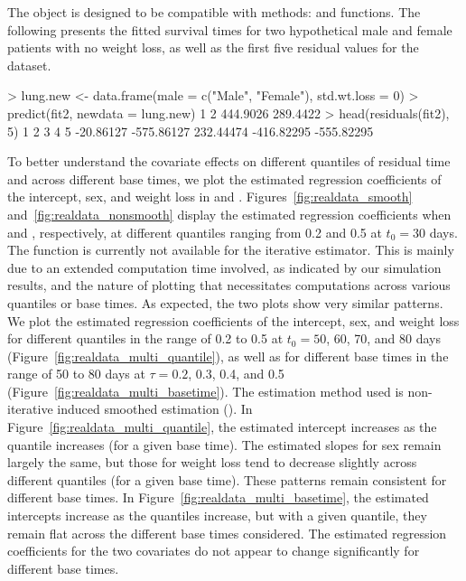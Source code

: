 The  object is designed to be compatible with  methods:  and 
 functions. 
The following presents the fitted survival times for two hypothetical male and female patients with no weight loss, 
as well as the first five residual values for the dataset.
 \begin{example}
  > lung.new <- data.frame(male = c("Male", "Female"), std.wt.loss = 0)
  > predict(fit2, newdata = lung.new)
         1        2 
  444.9026 289.4422 
  > head(residuals(fit2), 5)
         1          2          3          4          5 
 -20.86127 -575.86127  232.44474 -416.82295 -555.82295 
 \end{example}

To better understand the covariate effects on different quantiles of residual time and across different base times, 
we plot the estimated regression coefficients of the intercept, sex, and weight loss in  and .
Figures~\ref{fig:realdata_smooth} and~\ref{fig:realdata_nonsmooth} display the estimated regression coefficients when 
 and , respectively, at
different quantiles ranging from 0.2 and 0.5 at $t_0 = 30$ days. 
The  function is currently not available for the iterative estimator. This is mainly due to an extended computation time involved, as indicated by our simulation results, and the nature of plotting that necessitates computations across various quantiles or base times.
As expected, the two plots show very similar patterns. 
We plot the estimated regression coefficients of the intercept, sex, and weight loss for different quantiles in the range
of 0.2 to 0.5 at $t_0= 50$, 60, 70, and 80 days (Figure~\ref{fig:realdata_multi_quantile}), 
as well as for different base times in the range of 50 to 80 days at $\tau=0.2$, 0.3, 0.4, and 0.5 (Figure~\ref{fig:realdata_multi_basetime}). 
The estimation method used is non-iterative induced smoothed estimation (). 
In Figure~\ref{fig:realdata_multi_quantile}, 
the estimated intercept increases as the quantile increases (for a given base time). 
The estimated slopes for sex remain largely the same, 
but those for weight loss tend to decrease slightly across different quantiles (for a given base time). 
These patterns remain consistent for different base times.
In Figure~\ref{fig:realdata_multi_basetime}, the estimated intercepts increase as the quantiles increase, 
but with a given quantile, they remain flat across the different base times considered. 
The estimated regression coefficients for the two covariates do not appear to change significantly 
for different base times.

